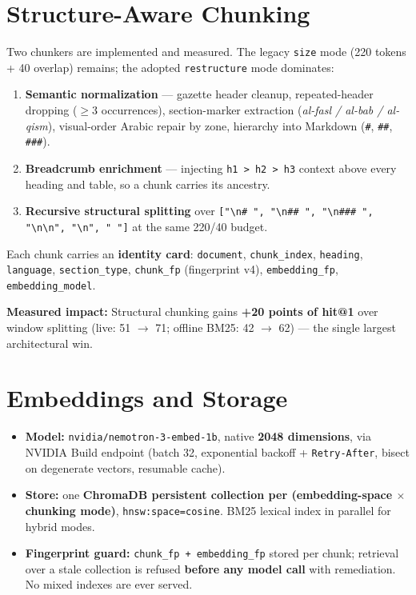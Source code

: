 \documentclass[a4paper,12pt]{report}
\begin{document}
\section{Structure-Aware Chunking}

Two chunkers are implemented and measured. The legacy \texttt{size} mode (220 tokens + 40 overlap) remains; the adopted \texttt{restructure} mode dominates:

\begin{enumerate}[leftmargin=1.2cm, itemsep=2pt]
\item \textbf{Semantic normalization} --- gazette header cleanup, repeated-header dropping ($\geq$3 occurrences), section-marker extraction (\textit{al-fasl / al-bab / al-qism}), visual-order Arabic repair by zone, hierarchy into Markdown (\texttt{\#}, \texttt{\#\#}, \texttt{\#\#\#}).
\item \textbf{Breadcrumb enrichment} --- injecting \texttt{h1 > h2 > h3} context above every heading and table, so a chunk carries its ancestry.
\item \textbf{Recursive structural splitting} over \texttt{["\textbackslash n\# ", "\textbackslash n\#\# ", "\textbackslash n\#\#\# ", "\textbackslash n\textbackslash n", "\textbackslash n", " "]} at the same 220/40 budget.
\end{enumerate}

Each chunk carries an \textbf{identity card}: \texttt{document}, \texttt{chunk\_index}, \texttt{heading}, \texttt{language}, \texttt{section\_type}, \texttt{chunk\_fp} (fingerprint v4), \texttt{embedding\_fp}, \texttt{embedding\_model}.

\begin{tcolorbox}[colback=accentTeal!08, colframe=accentTeal!35, boxrule=0.5pt, arc=3pt]
\small \textbf{Measured impact:} Structural chunking gains \textbf{+20 points of hit@1} over window splitting (live: 51 $\rightarrow$ 71; offline BM25: 42 $\rightarrow$ 62) --- the single largest architectural win.
\end{tcolorbox}

\section{Embeddings and Storage}

\begin{itemize}[leftmargin=1.2cm, itemsep=2pt]
\item \textbf{Model:} \texttt{nvidia/nemotron-3-embed-1b}, native \textbf{2048 dimensions}, via NVIDIA Build endpoint (batch 32, exponential backoff + \texttt{Retry-After}, bisect on degenerate vectors, resumable cache).
\item \textbf{Store:} one \textbf{ChromaDB persistent collection per (embedding-space $\times$ chunking mode)}, \texttt{hnsw:space=cosine}. BM25 lexical index in parallel for hybrid modes.
\item \textbf{Fingerprint guard:} \texttt{chunk\_fp + embedding\_fp} stored per chunk; retrieval over a stale collection is refused \textbf{before any model call} with remediation. No mixed indexes are ever served.
\end{itemize}
\end{document}
